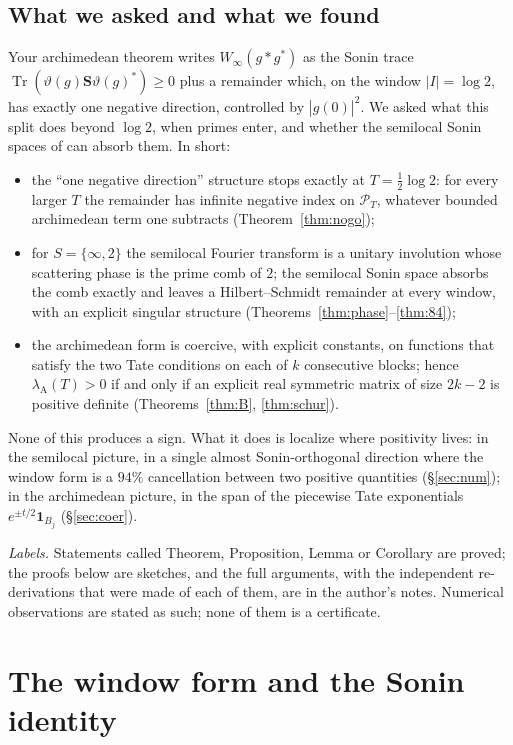 \documentclass[11pt]{amsart}
\theoremstyle{definition}
\theoremstyle{remark}
\newcommand{\Tr}{\operatorname{Tr}}
\newcommand{\PT}{\mathcal P_T}
\newcommand{\lamA}{\lambda_{\mathrm A}}
\begin{document}
\subsection*{What we asked and what we found}
Your archimedean theorem \cite[Thm.~1]{CC2021} writes $W_\infty(g*g^*)$ as the Sonin trace
$\Tr(\vartheta(g)\mathbf S\vartheta(g)^*)\ge0$ plus a remainder which, on the window $|I|=\log2$, has exactly
one negative direction, controlled by $|\widehat g(0)|^2$. We asked what this split does beyond
$\log2$, when primes enter, and whether the semilocal Sonin spaces of \cite{CCquasi,CCM2023,CCM2024} can
absorb them. In short:
\begin{itemize}
\item[(i)] the ``one negative direction'' structure stops exactly at $T=\frac12\log2$: for every larger $T$ the
remainder has infinite negative index on $\PT$, whatever bounded archimedean term one subtracts
(Theorem~\ref{thm:nogo});
\item[(ii)] for $S=\{\infty,2\}$ the semilocal Fourier transform is a unitary involution whose scattering phase is
the prime comb of $2$; the semilocal Sonin space absorbs the comb exactly and leaves a Hilbert--Schmidt
remainder at every window, with an explicit singular structure (Theorems~\ref{thm:phase}--\ref{thm:84});
\item[(iii)] the archimedean form is coercive, with explicit constants, on functions that satisfy the two Tate
conditions on each of $k$ consecutive blocks; hence $\lamA(T)>0$ if and only if an explicit real symmetric
matrix of size $2k-2$ is positive definite (Theorems~\ref{thm:B}, \ref{thm:schur}).
\end{itemize}
None of this produces a sign. What it does is localize where positivity lives: in the semilocal picture, in a
single almost Sonin-orthogonal direction where the window form is a $94\%$ cancellation between two positive
quantities (\S\ref{sec:num}); in the archimedean picture, in the span of the piecewise Tate exponentials
$e^{\pm t/2}\mathbf 1_{B_j}$ (\S\ref{sec:coer}).

\emph{Labels.} Statements called Theorem, Proposition, Lemma or Corollary are proved; the proofs below are
sketches, and the full arguments, with the independent re-derivations that were made of each of them, are in
the author's notes. Numerical observations are stated as such; none of them is a certificate.

\section{The window form and the Sonin identity}\label{sec:sonin}
\end{document}

